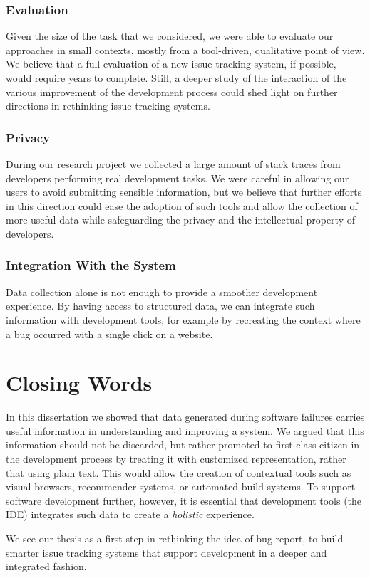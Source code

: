 \subsubsection{Evaluation}

Given the size of the task that we considered, we were able to evaluate our approaches in small contexts, mostly from a tool-driven, qualitative point of view.
We believe that a full evaluation of a new issue tracking system, if possible, would require years to complete.
Still, a deeper study of the interaction of the various improvement of the development process could shed light on further directions in rethinking issue tracking systems.


\subsubsection{Privacy}

During our research project we collected a large amount of stack traces from developers performing real development tasks.
We were careful in allowing our users to avoid submitting sensible information, but we believe that further efforts in this direction could ease the adoption of such tools and allow the collection of more useful data while safeguarding the privacy and the intellectual property of developers.


\subsubsection{Integration With the System}
Data collection alone is not enough to provide a smoother development experience.
By having access to structured data, we can integrate such information with development tools, for example by recreating the context where a bug occurred with a single click on a website.



\section{Closing Words}

In this dissertation we showed that data generated during software failures carries useful information in understanding and improving a system.
We argued that this information should not be discarded, but rather promoted to first-class citizen in the development process by treating it with customized representation, rather that using plain text.
This would allow the creation of contextual tools such as visual browsers, recommender systems, or automated build systems.
To support software development further, however, it is essential that development tools (\ie the IDE) integrates such data to create a \emph{holistic} experience.

We see our thesis as a first step in rethinking the idea of bug report, to build smarter issue tracking systems that support development in a deeper and integrated fashion.
